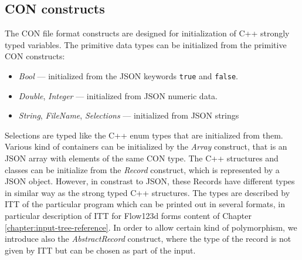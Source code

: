 \subsection{CON constructs}
The CON file format constructs are designed for initialization of C++ strongly typed variables. The primitive data types can be initialized from 
the primitive CON constructs: 
\begin{itemize}
 \item {\it Bool} --- initialized from the JSON keywords \verb'true' and \verb'false'.
 \item {\it Double}, {\it Integer} --- initialized from JSON numeric data. 
 \item {\it String}, {\it FileName}, {\it Selections} --- initialized from JSON strings
\end{itemize}
Selections are typed like the C++ enum types that are initialized from them.
Various kind of containers can be initialized by the {\it Array} construct, that is an JSON array with elements of the same CON type. 
The C++ structures and classes can be initialize from the {\it Record} construct, which is represented by a JSON object. However, in constrast to JSON,
these Records have different types in similar way as the strong typed C++ structures. The types are described by ITT of the particular program
which can be printed out in several formats, in particular description of ITT for Flow123d forms content of Chapter \ref{chapter:input-tree-reference}.
In order to allow certain kind of polymorphism, we introduce also the {\it AbstractRecord} construct, where the type of the record is not given by ITT but 
can be chosen as part of the input. 

